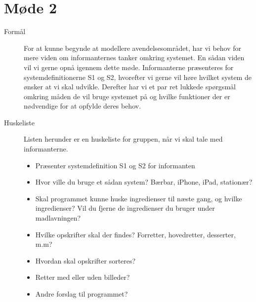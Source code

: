 \section{Møde 2}

\begin{description}

\item[Formål]
For at kunne begynde at modellere avendelsesområdet, har vi behov for mere viden om informanternes tanker omkring systemet. En sådan viden vil vi gerne opnå igennem dette møde. Informanterne præsenteres for systemdefinitionerne S1 og S2, hvorefter vi gerne vil høre hvilket system de ønsker at vi skal udvikle. Derefter har vi et par ret lukkede spørgsmål omkring måden de vil bruge systemet på og hvilke funktioner der er nødvendige for at opfylde deres behov.

\item[Huskeliste] Listen herunder er en huskeliste for gruppen, når vi skal tale med informanterne.

\begin{itemize}[noitemsep]
\item Præsenter systemdefinition S1 og S2 for informanten
\item Hvor ville du bruge et sådan system? Bærbar, iPhone, iPad, stationær?
\item Skal programmet kunne huske ingredienser til næste gang, og hvilke ingredienser? Vil du fjerne de ingredienser du bruger under madlavningen?
\item Hvilke opskrifter skal der findes? Forretter, hovedretter, desserter, m.m?
\item Hvordan skal opskrifter sorteres?
\item Retter med eller uden billeder?
\item Andre forslag til programmet?
\end{itemize}


\end{description}
